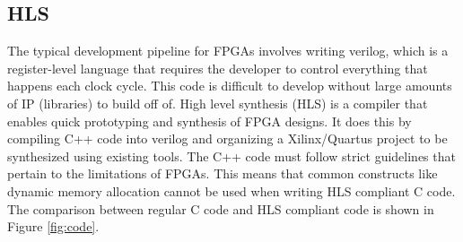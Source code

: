\documentclass[12pt]{article}
\begin{document}
	\subsection{HLS}
	The typical development pipeline for FPGAs involves writing verilog, which is a register-level language that requires the developer to control everything that happens each clock cycle. This code is difficult to develop without large amounts of IP (libraries) to build off of.
	High level synthesis (HLS) is a compiler that enables quick prototyping and synthesis of FPGA designs. It does this by compiling C++ code into verilog and organizing a Xilinx/Quartus project to be synthesized using existing tools. The C++ code must follow strict guidelines that pertain to the limitations of FPGAs. This means that common constructs like dynamic memory allocation cannot be used when writing HLS compliant C code. The comparison between regular C code and HLS compliant code is shown in Figure \ref{fig:code}. 
\end{document}
